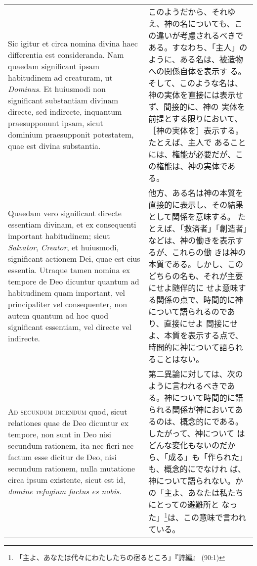 \documentclass[paper=a4paper,fontsize=10pt,jafontsize=9pt,titlepage]{jlreq}
\begin{document}
\begin{longtable}{p{21em}p{21em}}
Sic igitur et circa nomina divina haec differentia est
consideranda. Nam quaedam significant ipsam habitudinem ad creaturam,
ut {\itshape Dominus}. Et huiusmodi non significant substantiam
divinam directe, sed indirecte, inquantum praesupponunt ipsam, sicut
dominium praesupponit potestatem, quae est divina substantia.

&

このようだから、それゆえ、神の名についても、この違いが考慮されるべきで
ある。すなわち、「主人」のように、ある名は、被造物への関係自体を表示す
る。そして、このような名は、神の実体を直接には表示せず、間接的に、神の
実体を前提とする限りにおいて、［神の実体を］表示する。たとえば、主人で
あることには、権能が必要だが、この権能は、神の実体である。

\\

Quaedam vero significant directe essentiam divinam, et ex consequenti
important habitudinem; sicut {\itshape Salvator}, {\itshape Creator},
et huiusmodi, significant actionem Dei, quae est eius
essentia. Utraque tamen nomina ex tempore de Deo dicuntur quantum ad
habitudinem quam important, vel principaliter vel consequenter, non
autem quantum ad hoc quod significant essentiam, vel directe vel
indirecte.

&

他方、ある名は神の本質を直接的に表示し、その結果として関係を意味する。
たとえば、「救済者」「創造者」などは、神の働きを表示するが、これらの働
きは神の本質である。しかし、このどちらの名も、それが主要にせよ随伴的に
せよ意味する関係の点で、時間的に神について語られるのであり、直接にせよ
間接にせよ、本質を表示する点で、時間的に神について語られることはない。

\\

{\scshape Ad secundum dicendum} quod, sicut relationes quae de Deo
dicuntur ex tempore, non sunt in Deo nisi secundum rationem, ita nec
fieri nec factum esse dicitur de Deo, nisi secundum rationem, nulla
mutatione circa ipsum existente, sicut est id, {\itshape domine
refugium factus es nobis}.

&

第二異論に対しては、次のように言われるべきである。神について時間的に語
られる関係が神においてあるのは、概念的にである。したがって、神について
はどんな変化もないのだから、「成る」も「作られた」も、概念的にでなけれ
ば、神について語られない。かの「主よ、あなたは私たちにとっての避難所と
なった」\footnote{「主よ、あなたは代々にわたしたちの宿るところ」『詩編』
(90:1)}は、この意味で言われている。


\end{longtable}
\end{document}
